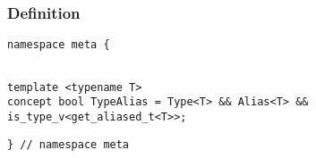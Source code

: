 
\subsubsection{Definition}

\begin{verbatim}
namespace meta {
\end{verbatim}
\begin{verbatim}

template <typename T>
concept bool TypeAlias = Type<T> && Alias<T> && is_type_v<get_aliased_t<T>>;

\end{verbatim}
\begin{verbatim}
} // namespace meta
\end{verbatim}
